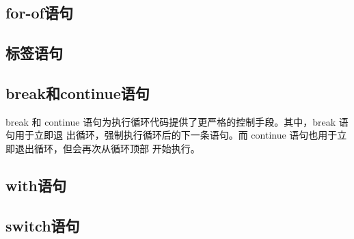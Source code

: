 \subsection{for-of语句}
\subsection{标签语句}
\subsection{break和continue语句}
break 和 continue 语句为执行循环代码提供了更严格的控制手段。其中，break 语句用于立即退
出循环，强制执行循环后的下一条语句。而 continue 语句也用于立即退出循环，但会再次从循环顶部
开始执行。
\subsection{with语句}
\subsection{switch语句}
